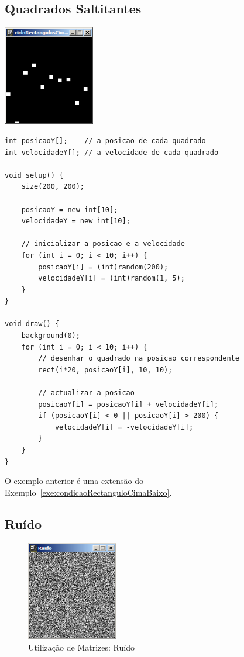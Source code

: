 \subsection{Quadrados Saltitantes}
\begin{center}
	\includegraphics[width=4cm]{images/cicloRectangulosCimaBaixo.eps}
\end{center}
\begin{lstlisting}[caption=Utilização de vectores, label=exe:cicloRectangulosCimaBaixo]
int posicaoY[];    // a posicao de cada quadrado
int velocidadeY[]; // a velocidade de cada quadrado

void setup() {
    size(200, 200);
    
    posicaoY = new int[10];
    velocidadeY = new int[10];
    
    // inicializar a posicao e a velocidade
    for (int i = 0; i < 10; i++) {
        posicaoY[i] = (int)random(200);
        velocidadeY[i] = (int)random(1, 5);
    }
}

void draw() {
    background(0);
    for (int i = 0; i < 10; i++) {
        // desenhar o quadrado na posicao correspondente
        rect(i*20, posicaoY[i], 10, 10);
        
        // actualizar a posicao
        posicaoY[i] = posicaoY[i] + velocidadeY[i];
        if (posicaoY[i] < 0 || posicaoY[i] > 200) {
            velocidadeY[i] = -velocidadeY[i];
        }
    }
}
\end{lstlisting}
O exemplo anterior é uma extensão do Exemplo~\ref{exe:condicaoRectanguloCimaBaixo}.

\subsection{Ruído}
\begin{figure}
	\centering
		\includegraphics[width=4cm]{images/ruido.eps}
	\caption{Utilização de Matrizes: Ruído}
	\label{fig:ruido}
\end{figure}

